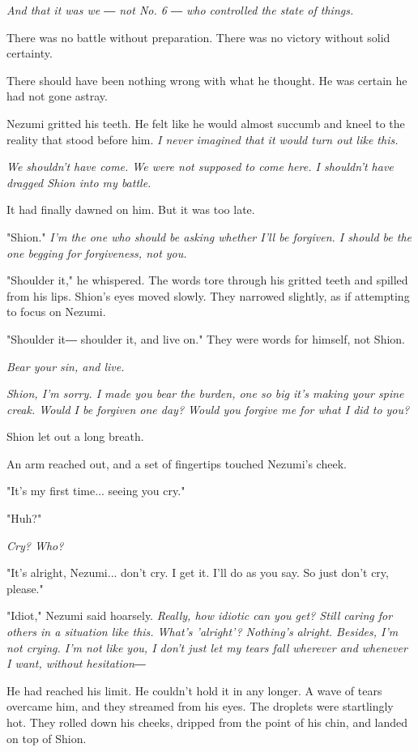 \emph{And that it was we ― not No. 6 ― who controlled the state of things.}

There was no battle without preparation. There was no victory without
solid certainty.

There should have been nothing wrong with what he thought. He was
certain he had not gone astray.

Nezumi gritted his teeth. He felt like he would almost succumb and kneel
to the reality that stood before him. \emph{I never imagined that it would
	turn out like this.}

\emph{We shouldn't have come. We were not supposed to come here. I shouldn't
	have dragged Shion into my battle.}

It had finally dawned on him. But it was too late.

"Shion." \emph{I'm the one who should be asking whether I'll be forgiven. I
	should be the one begging for forgiveness, not you.}

"Shoulder it," he whispered. The words tore through his gritted teeth
and spilled from his lips. Shion's eyes moved slowly. They narrowed
slightly, as if attempting to focus on Nezumi.

"Shoulder it― shoulder it, and live on." They were words for himself,
not Shion.

\emph{Bear your sin, and live.}

\emph{Shion, I'm sorry. I made you bear the burden, one so big it's making
	your spine creak. Would I be forgiven one day? Would you forgive me for
	what I did to you?}

Shion let out a long breath.

An arm reached out, and a set of fingertips touched Nezumi's cheek.

"It's my first time... seeing you cry."

"Huh?"

\emph{Cry? Who?}

"It's alright, Nezumi... don't cry. I get it. I'll do as you say. So
just don't cry, please."

"Idiot," Nezumi said hoarsely. \emph{Really, how idiotic can you get? Still
	caring for others in a situation like this. What's 'alright'? Nothing's
	alright. Besides, I'm not crying. I'm not like you, I don't just let my
	tears fall wherever and whenever I want, without hesitation―}

He had reached his limit. He couldn't hold it in any longer. A wave of
tears overcame him, and they streamed from his eyes. The droplets were
startlingly hot. They rolled down his cheeks, dripped from the point of
his chin, and landed on top of Shion.

